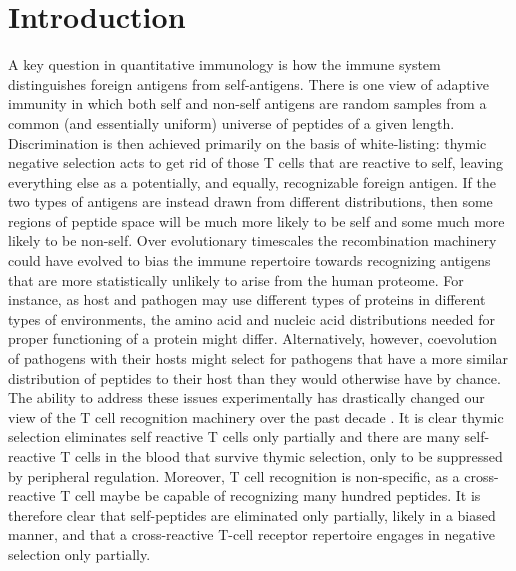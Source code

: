 \documentclass[superscriptaddress,twocolumn,pre]{revtex4}
\newcommand{\<}{\langle}
\renewcommand{\>}{\rangle}
\begin{document}
\section{Introduction}

A key question in quantitative immunology is how the immune system distinguishes foreign antigens from self-antigens. There is one view of adaptive immunity in which both self and non-self antigens are random samples from a common (and essentially uniform) universe of peptides of a given length. Discrimination is then achieved primarily on the basis of white-listing: thymic negative selection acts to get rid of those T cells that are reactive to self, leaving everything else as a potentially, and equally, recognizable foreign antigen. If the two types of antigens are instead drawn from different distributions, then some regions of peptide space will be much more likely to be self and some much more likely to be non-self. Over evolutionary timescales the recombination machinery could have evolved to bias the immune repertoire towards recognizing antigens that are more statistically unlikely to arise from the human proteome. For instance, as  host and pathogen may use different types of proteins in different types of environments, the amino acid and nucleic acid distributions needed for proper functioning of a protein might differ. Alternatively, however, coevolution of pathogens with their hosts might select for pathogens that have a more similar distribution of peptides to their host than they would otherwise have by chance. The ability to address these issues experimentally has drastically changed our view of the T cell recognition machinery over the past decade \cite{Davis2015, Birnbaum2014}. It is clear thymic selection eliminates self reactive T cells only partially and there are many self-reactive T cells in the blood that survive thymic selection, only to be suppressed by peripheral regulation. Moreover, T cell recognition is non-specific, as a cross-reactive T cell maybe be capable of recognizing many hundred peptides. It is therefore clear that self-peptides are eliminated only partially, likely in a biased manner, and that a cross-reactive T-cell receptor repertoire engages in negative selection only partially. 
\end{document}

